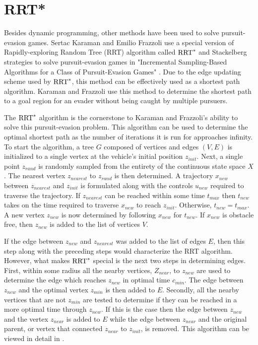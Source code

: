 \section{RRT*}
Besides dynamic programming, other methods have been used to solve pursuit-evasion games. Sertac Karaman and Emilio Frazzoli use a special version of Rapidly-exploring Random Tree (RRT) algorithm called $\textnormal{RRT}^*$ and Stackelberg strategies to solve pursuit-evasion games in "Incremental Sampling-Based Algorithms for a Class of Pursuit-Evasion Games" \cite{karaman}. Due to the edge updating scheme used by $\textnormal{RRT}^*$, this method can be effectively used as a shortest path algorithm. Karaman and Frazzoli use this method to determine the shortest path to a goal region for an evader without being caught by multiple pursuers.

The $\textnormal{RRT}^*$ algorithm is the cornerstone to Karaman and Frazzoli's ability to solve this pursuit-evasion problem. This algorithm can be used to determine the optimal shortest path as the number of iterations it is run for approaches infinity. To start the algorithm, a tree $G$ composed of vertices and edges $(V,E)$ is initialized to a single vertex at the vehicle's initial position $z_{init}$. Next, a single point $z_{rand}$ is randomly sampled from the entirety of the continuous state space $X$. The nearest vertex $z_{nearest}$ to $z_{rand}$ is then determined. A trajectory $x_{new}$ between $z_{nearest}$ and $z_{init}$ is formulated along with the controls $u_{new}$ required to traverse the trajectory. If $z_{nearest}$ can be reached within some time $t_{max}$ then $t_{new}$ takes on the time required to traverse $x_{new}$ to reach $z_{init}$. Otherwise, $t_{new} = t_{max}$. A new vertex $z_{new}$ is now determined by following $x_{new}$ for $t_{new}$. If $x_{new}$ is obstacle free, then $z_{new}$ is added to the list of vertices $V$. 

If the edge between $z_{new}$ and $z_{nearest}$ was added to the list of edges $E$, then this step along with the preceding steps would characterize the RRT algorithm. However, what makes $\textnormal{RRT}^*$ special is the next two steps in determining edges. First, within some radius all the nearby vertices, $Z_{near}$, to $z_{new}$ are used to determine the edge which reaches $z_{new}$ in optimal time $c_{min}$. The edge between $z_{new}$ and the optimal vertex $z_{min}$ is then added to $E$. Secondly, all the nearby vertices that are not $z_{min}$ are tested to determine if they can be reached in a more optimal time through $z_{new}$. If this is the case then the edge between $z_{new}$ and the vertex $z_{near}$ is added to $E$ while the edge between $z_{near}$ and the original parent, or vertex that connected $z_{near}$ to $z_{init}$, is removed. This algorithm can be viewed in detail in . \cite{karaman} 
  
